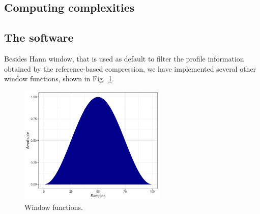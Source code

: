 \subsection{Computing complexities}

\subsection{The software}

Besides Hann window, that is used as default to filter the profile information obtained by the reference-based compression, we have implemented several other window functions, shown in Fig.~\ref{fig.filters}.
\begin{figure}[!h]
  \centering
\includegraphics[width=7cm]{hann.pdf}
\caption{Window functions.}
\label{fig.filters}
\end{figure}

